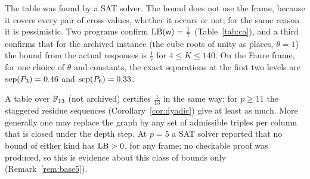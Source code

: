 The table was found by a SAT solver. The bound does not use the frame, because it covers every pair of cross values, whether it occurs or not; for the same reason it is pessimistic. Two programs confirm $\mathrm{LB}(\mathsf w)=\frac17$ (Table~\ref{tab:ca}), and a third confirms that for the archived instance (the cube roots of unity as places, $\theta=1$) the bound from the actual responses is $\frac17$ for $4\le K\le140$. On the Faure frame, for one choice of $\theta$ and constants, the exact separations at the first two levels are $\operatorname{sep}(P_3)=0.46$ and $\operatorname{sep}(P_6)=0.33$.

A table over $\mathbb{F}_{13}$ (not archived) certifies $\frac1{13}$ in the same way; for $p\ge11$ the staggered residue sequences (Corollary~\ref{cor:dyadic}) give at least as much. More generally one may replace the graph by any set of admissible triples per column that is closed under the depth step. At $p=5$ a SAT solver reported that no bound of either kind has $\mathrm{LB}>0$, for any frame; no checkable proof was produced, so this is evidence about this class of bounds only (Remark~\ref{rem:base5}).
